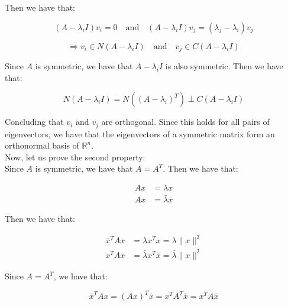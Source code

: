 Then we have that:

\begin{equation*}
    (A - \lambda_i I) v_i = 0 \quad \text{and} \quad (A - \lambda_i I) v_j = (\lambda_j - \lambda_i) v_j 
\end{equation*}

\begin{equation}
    \Rightarrow v_i \in N(A - \lambda_i I) \quad \text{and} \quad v_j \in C(A - \lambda_i I)
\end{equation}

Since $A$ is symmetric, we have that $A - \lambda_i I$ is also symmetric. Then we have that:

\begin{equation}
    N(A - \lambda_i I) = N((A - \lambda_i)^T) \perp C(A - \lambda_i I)
\end{equation}

Concluding that $v_i$ and $v_j$ are orthogonal. Since this holds for all pairs of eigenvectors, we have that the eigenvectors
of a symmetric matrix form an orthonormal basis of $\mathbb{R}^n$.\\

Now, let us prove the second property:\\

Since $A$ is symmetric, we have that $A = A^T$. Then we have that:

\begin{equation}
    \begin{aligned}
        A x &= \lambda x \\
        A \bar{x} &= \bar{\lambda} \bar{x}
    \end{aligned}
\end{equation}

Then we have that:

\begin{equation}
    \begin{aligned}
        \bar{x}^T A x &= \lambda x^T x = \lambda \|x\|^2 \\
        x^T A \bar{x} &= \bar{\lambda} x^T \bar{x} = \bar{\lambda} \|x\|^2
    \end{aligned}
\end{equation}

Since $A = A^T$, we have that:

\begin{equation}
    \bar{x}^T A x = (A x)^T \bar{x} = x^T A^T \bar{x} = x^T A \bar{x}
\end{equation}

